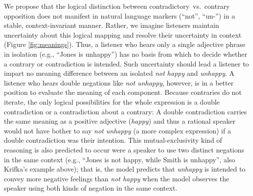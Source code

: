 \documentclass[floatsintext,doc]{apa6}
\begin{document}
We propose that the logical distinction between contradictory~vs.~contrary opposition does not manifest in natural language markers (\enquote{not}, \enquote{un-}) in a stable, context-invariant manner. 
Rather, we imagine listeners maintain uncertainty about this logical mapping and resolve their uncertainty in context (Figure \ref{fig:meanings}).  
Thus, a listener who hears only a single adjective phrase in isolation (e.g., \enquote{Jones is unhappy}) has no basis from which to decide whether a contrary or contradiction is intended. 
Such uncertainty should lead a listener to impart no meaning difference between an isolated \emph{not happy} and \emph{unhappy}.
A listener who hears double negations like \emph{not unhappy}, however, is in a better position to evaluate the meaning of each component. 
Because contraries do not iterate, the only logical possibilities for the whole expression is a double contradiction  or a contradiction about a contrary: A double contradiction carries the same meaning as a positive adjective (\emph{happy}) and thus a rational speaker would not have bother to say \emph{not unhappy} (a more complex expression) if a double contradiction was their intention. 
This mutual-exclusivity kind of reasoning is also predicted to occur were a speaker to use two distinct negations in the same context (e.g., \enquote{Jones is not happy, while Smith is unhappy}, also Krifka's example above); that is, the model predicts that \emph{unhappy} is intended to convey more negative feelings than \emph{not happy} when the model observes the speaker using both kinds of negation in the same context.
\end{document}
